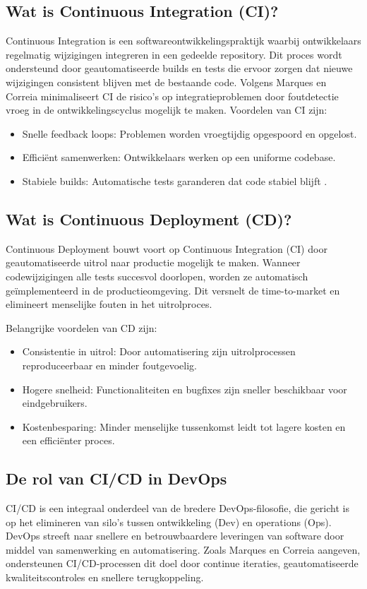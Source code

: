 \subsection{Wat is Continuous Integration (CI)?}
Continuous Integration is een softwareontwikkelingspraktijk waarbij ontwikkelaars regelmatig wijzigingen integreren in een gedeelde repository. Dit proces wordt ondersteund door geautomatiseerde builds en tests die ervoor zorgen dat nieuwe wijzigingen consistent blijven met de bestaande code. Volgens Marques en Correia \autocite{marques2023} minimaliseert CI de risico's op integratieproblemen door foutdetectie vroeg in de ontwikkelingscyclus mogelijk te maken. Voordelen van CI zijn:
\begin{itemize}
    \item Snelle feedback loops: Problemen worden vroegtijdig opgespoord en opgelost.
    \item Efficiënt samenwerken: Ontwikkelaars werken op een uniforme codebase.
    \item Stabiele builds: Automatische tests garanderen dat code stabiel blijft .
\end{itemize}

\subsection{Wat is Continuous Deployment (CD)?}
Continuous Deployment bouwt voort op Continuous Integration (CI) door geautomatiseerde uitrol naar productie mogelijk te maken. Wanneer codewijzigingen alle tests succesvol doorlopen, worden ze automatisch geïmplementeerd in de productieomgeving. Dit versnelt de time-to-market en elimineert menselijke fouten in het uitrolproces. \autocite{Learn2024}

Belangrijke voordelen van CD zijn:

\begin{itemize}
    \item Consistentie in uitrol: Door automatisering zijn uitrolprocessen reproduceerbaar en minder foutgevoelig.
    \item Hogere snelheid: Functionaliteiten en bugfixes zijn sneller beschikbaar voor eindgebruikers.
    \item Kostenbesparing: Minder menselijke tussenkomst leidt tot lagere kosten en een efficiënter proces.
\end{itemize}

\subsection{De rol van CI/CD in DevOps}
CI/CD is een integraal onderdeel van de bredere DevOps-filosofie, die gericht is op het elimineren van silo's tussen ontwikkeling (Dev) en operations (Ops). DevOps streeft naar snellere en betrouwbaardere leveringen van software door middel van samenwerking en automatisering. Zoals Marques en Correia \autocite{marques2023} aangeven, ondersteunen CI/CD-processen dit doel door continue iteraties, geautomatiseerde kwaliteitscontroles en snellere terugkoppeling.

